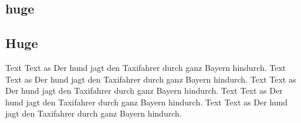 \documentclass[10pt, a4paper, draft]{article}
\begin{document}
{\LARGE \blindtext\par}

\subsection{huge}

{\huge \blindtext\par}

\subsection{Huge}

{\Huge \blindtext\par}

{\Huge
Text Text as Der hund jagt den Taxifahrer durch ganz Bayern hindurch. {\normalsize Text Text} as Der hund jagt den Taxifahrer durch ganz Bayern hindurch. Text Text as Der hund jagt den Taxifahrer durch ganz Bayern hindurch. Text Text as Der hund jagt den Taxifahrer durch ganz Bayern hindurch. Text Text as Der hund jagt den Taxifahrer durch ganz Bayern hindurch. }
\end{document}
